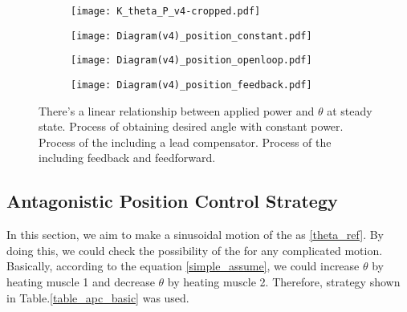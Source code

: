 \begin{figure}[t]
	\centering
	\begin{minipage}{0.30\textwidth}
		\begin{subfigure}{\linewidth}
			\centering
			\texttt{[image: K\_theta\_P\_v4-cropped.pdf]}
			\caption{\label{KthetaP}}
		\end{subfigure}
	\end{minipage}%
	\begin{minipage}{0.6\textwidth}
		\centering
		\begin{subfigure}{0.55\linewidth}
			\centering
			\texttt{[image: Diagram(v4)\_position\_constant.pdf]}
			\caption{\label{AntaControl_constant}}
		\end{subfigure}
		
		\begin{subfigure}{0.73\linewidth}
			\centering
			\texttt{[image: Diagram(v4)\_position\_openloop.pdf]}
			\caption{\label{position_open_loop}}
		\end{subfigure}
		
		\begin{subfigure}{\linewidth}
			\centering
			\texttt{[image: Diagram(v4)\_position\_feedback.pdf]}
			\caption{\label{position_closed_loop}}
		\end{subfigure}
	\end{minipage}
	\caption[Block diagrams for the \apc]{ There's a linear relationship between applied power and $\theta$ at steady state.  Process of obtaining desired angle with constant power.  Process of the \apc including a lead compensator.  Process of the \apc including feedback and feedforward.}
	\label{anta_position_diagrams}
\end{figure}


\subsection{Antagonistic Position Control Strategy}
In this section, we aim to make a sinusoidal motion of the \anta as \eqref{theta_ref}. By doing this, we could check the possibility of the \apc for any complicated motion. Basically, according to the equation \eqref{simple_assume}, we could increase $\theta$ by heating muscle 1 and decrease $\theta$ by heating muscle 2. Therefore, strategy shown in Table.\ref{table_apc_basic} was used.

